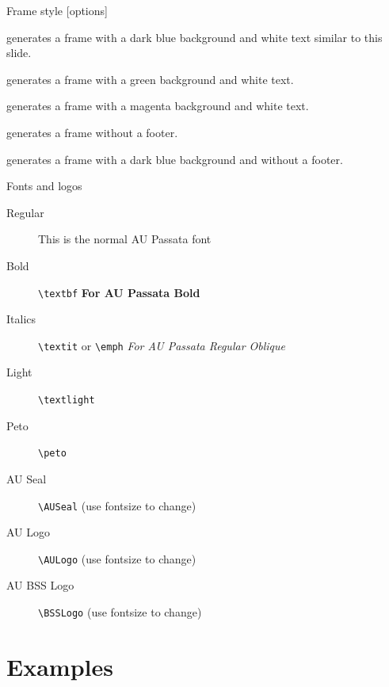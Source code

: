 \documentclass[aspectratio=169]{beamer}
\begin{document}
\begin{frame}[AUDark]{Frame style [options]}
\begin{description}[AUCleanDark]
\item[AUDark] generates a frame with a dark blue background and white text similar to this slide.
\item[AUGreen] generates a frame with a green background and white text.
\item[AUMagenta] generates a frame with a magenta background and white text.
\item[AUClean] generates a frame without a footer.
\item[AUDarkClean] generates a frame with a dark blue background and without a footer.
\end{description}
\end{frame}

\begin{frame}{Fonts and logos}
\begin{description}
\item[Regular] This is the normal AU Passata font
\item[Bold]  \verb=\textbf= \textbf{For AU Passata Bold}
\item[Italics] \verb=\textit= or \verb=\emph= \textit{For AU Passata Regular Oblique}
\item[Light] \verb=\textlight= 
\item[Peto] \verb=\peto= \footnotemark
\item[AU Seal] \verb=\AUSeal= \hspace{0.5em}\AUSeal\hspace{0.5em}(use fontsize to change)\footnotemark[\value{footnote}]
\item[AU Logo] \verb=\AULogo= \hspace{0.5em}\AULogo\hspace{0.5em}(use fontsize to change)\footnotemark[\value{footnote}]
\item[AU BSS Logo] \verb=\BSSLogo= \hspace{0.5em}\BSSLogo \hspace{0.5em} (use fontsize to change)\footnotemark[\value{footnote}]
\end{description}
\end{frame}

\section{Examples}
\end{document}
